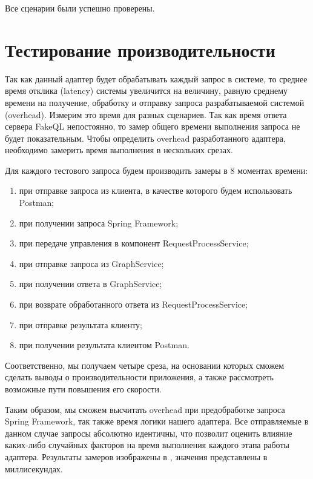 Все сценарии были успешно проверены.

\section{Тестирование производительности} \label{sec:ch4-performance}

Так как данный адаптер будет обрабатывать каждый запрос в системе, то среднее время отклика (latency) системы увеличится на величину, равную среднему времени на получение, обработку и отправку запроса разрабатываемой системой (overhead).
Измерим это время для разных сценариев.
Так как время ответа сервера FakeQL непостоянно, то замер общего времени выполнения запроса не будет показательным.
Чтобы определить overhead разработанного адаптера, необходимо замерить время выполнения в нескольких срезах.

Для каждого тестового запроса будем производить замеры в 8 моментах времени:
\begin{enumerate}
	\item при отправке запроса из клиента, в качестве которого будем использовать Postman;
	\item при получении запроса Spring Framework;
	\item при передаче управления в компонент RequestProcessService;
	\item при отправке запроса из GraphService;
	\item при получении ответа в GraphService;
	\item при возврате обработанного ответа из RequestProcessService;
	\item при отправке результата клиенту;
	\item при получении результата клиентом Postman.
\end{enumerate}
Соответственно, мы получаем четыре среза, на основании которых сможем сделать выводы о производительности приложения, а также рассмотреть возможные пути повышения его скорости.

Таким образом, мы сможем высчитать overhead при предобработке запроса Spring Framework, так также время логики нашего адаптера.
Все отправляемые в данном случае запросы абсолютно идентичны, что позволит оценить влияние каких-либо случайных факторов на время выполнения каждого этапа работы адаптера.
Результаты замеров изображены в , значения представлены в миллисекундах.

